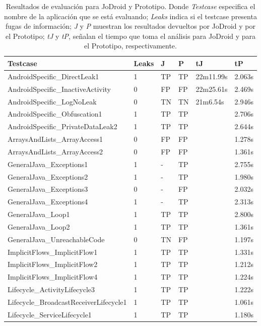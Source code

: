 \label{subsec:jvsp}
\begin{table}[H]
\begin{center}
\small\addtolength{\tabcolsep}{-3pt}
\caption{Resultados de evaluación para JoDroid y Prototipo. Donde
\textit{Testcase} especifica el nombre de la aplicación que se está evaluando;
\textit{Leaks} indica si el testcase presenta fugas de información; \textit{J} y
\textit{P} muestran los resultados devueltos por JoDroid y por el Prototipo;
\textit{tJ} y \textit{tP}, señalan el tiempo que toma el análisis para JoDroid
y para el Prototipo, respectivamente.}
\label{tab:JoDroid-Prototipo}
\begin{tabular}{|p{6cm}|p{1cm}|p{1cm}|p{1cm}|p{}|p{1cm}|}
	\hline
	\textbf{Testcase} & \textbf{Leaks} & \textbf{J} &
	\textbf{P} & \textbf{ tJ} & 
	\textbf{tP}\\
	\hline
	AndroidSpecific\_DirectLeak1 & 1 & TP & TP & 22m11.99s &2.063s\\
	\hline
	AndroidSpecific\_InactiveActivity & 0 & FP & FP  & 22m25.61s &2.469s\\
	\hline
	AndroidSpecific\_LogNoLeak & 0 & TN & TN & 21m6.54s &2.946s\\
	\hline
	AndroidSpecific\_Obfuscation1 & 1 & TP & TP &&2.706s\\
	\hline
	 AndroidSpecific\_PrivateDataLeak2 & 1 & TP & TP &&2.644s\\
	\hline
	 ArraysAndLists\_ArrayAccess1 & 0 & FP & FP && 1.278s\\
	\hline
	 ArraysAndLists\_ArrayAccess2 & 0 & FP & FP &&1.361s\\
	 \hline
	 GeneralJava\_Exceptions1 & 1 & - & TP &&2.755s\\
	\hline
	 GeneralJava\_Exceptions2 & 1 & - & TP &&1.980s\\
	\hline
	GeneralJava\_Exceptions3 & 0 &  - & FP &&2.032s\\
	\hline
	GeneralJava\_Exceptions4 & 1 & - & TP &&2.313s\\
	\hline
	GeneralJava\_Loop1 & 1 & TP & TP &&2.800s\\
	\hline
	GeneralJava\_Loop2 & 1 & TP & TP &&1.361s\\
	\hline
	GeneralJava\_UnreachableCode & 0 & TN & FP &&1.197s\\
	\hline
	ImplicitFlows\_ImplicitFlow1 & 1 & TP & TP &&1.331s\\
	\hline
	ImplicitFlows\_ImplicitFlow2 & 1 & TP & TP &&1.212s\\
	\hline
	ImplicitFlows\_ImplicitFlow4 & 1 & TP & TP &&1.224s\\
	\hline
	Lifecycle\_ActivityLifecycle3 & 1 & TP & TP &&1.222s\\
	\hline
	Lifecycle\_BroadcastReceiverLifecycle1 & 1 & TP & TP &&1.061s\\
	\hline
	Lifecycle\_ServiceLifecycle1 & 1 & TP & TP &&1.180s\\
	\hline
\end{tabular}
\end{center}
\end{table}

